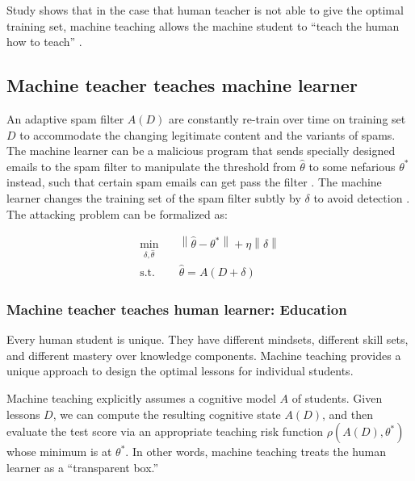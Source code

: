         Study shows that in the case that human teacher is not able to give the optimal training set,
        machine teaching allows the machine student to ``teach the human how to teach'' \cite{Suh2016}.

    \subsection{Machine teacher teaches machine learner}

        An adaptive spam filter $A(D)$ are constantly re-train over time on training set $D$ to accommodate
        the changing legitimate content and the variants of spams.
        The machine learner can be a malicious program that sends specially designed emails
        to the spam filter to manipulate the threshold from $\hat{\theta}$ to some nefarious $\theta^*$ instead,
        such that certain spam emails can get pass the filter \cite{Alfeld2016}.
        The machine learner changes the training set of the spam filter subtly by $\delta$ to avoid detection \cite{Mei2015}.
        The attacking problem can be formalized as:

        \begin{equation*}
        \begin{aligned}
            \min_{\delta, \hat{\theta}} \quad &
            \left\lVert\hat{\theta} - \theta^*\right\rVert + \eta \left\lVert\delta\right\rVert \\
            \textrm{s.t.} \quad & \hat{\theta} = A(D+\delta)
        \end{aligned}
        \end{equation*}

    \subsubsection{Machine teacher teaches human learner: Education}

        Every human student is unique.
        They have different mindsets, different skill sets, and different mastery over knowledge components.
        Machine teaching provides a unique approach to design the optimal lessons for individual students.

        Machine teaching explicitly assumes a cognitive model $A$ of students.
        Given lessons $D$, we can compute the resulting cognitive state $A(D)$,
        and then evaluate the test score via an appropriate teaching risk function $\rho(A(D), \theta^*)$
        whose minimum is at $\theta^*$.
        In other words, machine teaching treats the human learner as a ``transparent box.''

